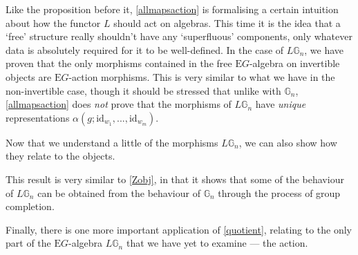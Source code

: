 \documentclass{amsart} %
\begin{document}
Like the proposition before it, \cref{allmapsaction} is formalising a certain intuition about how the functor $L$ should act on algebras. This time it is the idea that a `free' structure really shouldn't have any `superfluous' components, only whatever data is absolutely required for it to be well-defined. In the case of $L\mathbb{G}_n$, we have proven that the only morphisms contained in the free $\mathrm{E}G$-algebra on invertible objects are $\mathrm{E}G$-action morphisms. This is very similar to what we have in the non-invertible case, though it should be stressed that unlike with $\mathbb{G}_n$, \cref{allmapsaction} does \emph{not} prove that the morphisms of $L\mathbb{G}_n$ have \emph{unique} representations $\alpha(g; \mathrm{id}_{w_1}, ..., \mathrm{id}_{w_m})$.

Now that we understand a little of the morphisms $L\mathbb{G}_n$, we can also show how they relate to the objects.

This result is very similar to \cref{Zobj}, in that it shows that some of the behaviour of $L\mathbb{G}_n$ can be obtained from the behaviour of $\mathbb{G}_n$ through the process of group completion.

Finally, there is one more important application of \cref{quotient}, relating to the only part of the $\mathrm{E}G$-algebra $L\mathbb{G}_n$ that we have yet to examine --- the action.
\end{document}
